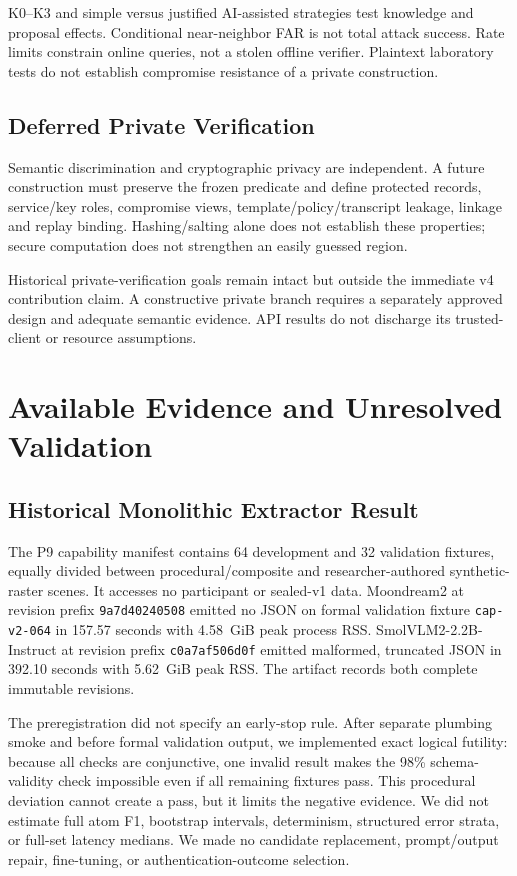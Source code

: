 \documentclass[compsoc,conference,a4paper,10pt,times]{IEEEtran}
\begin{document}
K0--K3 and simple versus justified AI-assisted strategies test knowledge and proposal effects. Conditional near-neighbor FAR is not total attack success. Rate limits constrain online queries, not a stolen offline verifier. Plaintext laboratory tests do not establish compromise resistance of a private construction.

\subsection{Deferred Private Verification}
Semantic discrimination and cryptographic privacy are independent. A future construction must preserve the frozen predicate and define protected records, service/key roles, compromise views, template/policy/transcript leakage, linkage and replay binding. Hashing/salting alone does not establish these properties; secure computation does not strengthen an easily guessed region.

Historical private-verification goals remain intact but outside the immediate v4 contribution claim. A constructive private branch requires a separately approved design and adequate semantic evidence. API results do not discharge its trusted-client or resource assumptions.

\section{Available Evidence and Unresolved Validation}
\label{sec:evidence}
\subsection{Historical Monolithic Extractor Result}
The P9 capability manifest contains 64 development and 32 validation fixtures, equally divided between procedural/composite and researcher-authored synthetic-raster scenes. It accesses no participant or sealed-v1 data. Moondream2 at revision prefix \texttt{9a7d40240508} emitted no JSON on formal validation fixture \texttt{cap-v2-064} in 157.57 seconds with 4.58~GiB peak process RSS. SmolVLM2-2.2B-Instruct at revision prefix \texttt{c0a7af506d0f} emitted malformed, truncated JSON in 392.10 seconds with 5.62~GiB peak RSS. The artifact records both complete immutable revisions.

The preregistration did not specify an early-stop rule. After separate plumbing smoke and before formal validation output, we implemented exact logical futility: because all checks are conjunctive, one invalid result makes the 98\% schema-validity check impossible even if all remaining fixtures pass. This procedural deviation cannot create a pass, but it limits the negative evidence. We did not estimate full atom F1, bootstrap intervals, determinism, structured error strata, or full-set latency medians. We made no candidate replacement, prompt/output repair, fine-tuning, or authentication-outcome selection.
\end{document}
